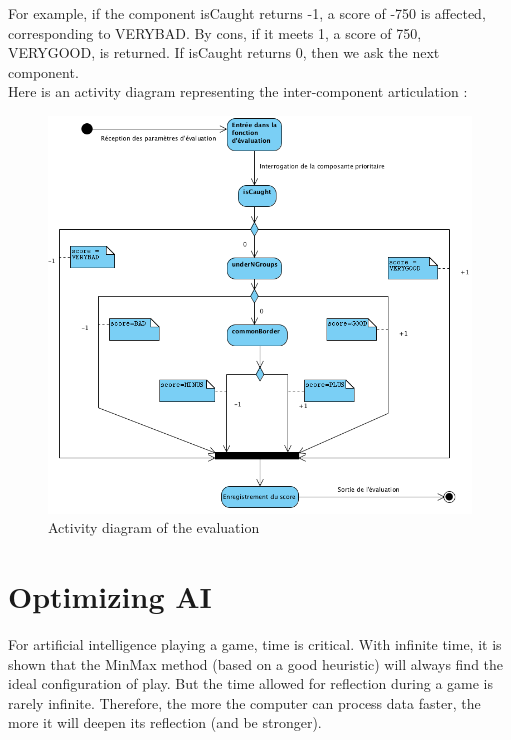 \documentclass[11pt,a4paper]{report}
\begin{document}
For example, if the component isCaught returns -1, a score of -750 is affected, corresponding to VERYBAD. By cons, if it meets 1, a score of 750, VERYGOOD, is returned. If isCaught returns 0, then we ask the next component.\\



Here is an activity diagram representing the inter-component articulation :

\begin{figure}[h]
\centering
\includegraphics[width=1\textwidth]{activity_diagram.png}
\caption{Activity diagram of the evaluation}
\label{activity_diagram}
\end{figure}

\chapter*{Optimizing AI}
 

For artificial intelligence playing a game, time is critical. With infinite time, it is shown that the MinMax method (based on a good heuristic) will always find the ideal configuration of play. But the time allowed for reflection during a game is rarely infinite. Therefore, the more the computer can process data faster, the more it will deepen its reflection (and be stronger). \\
\end{document}
